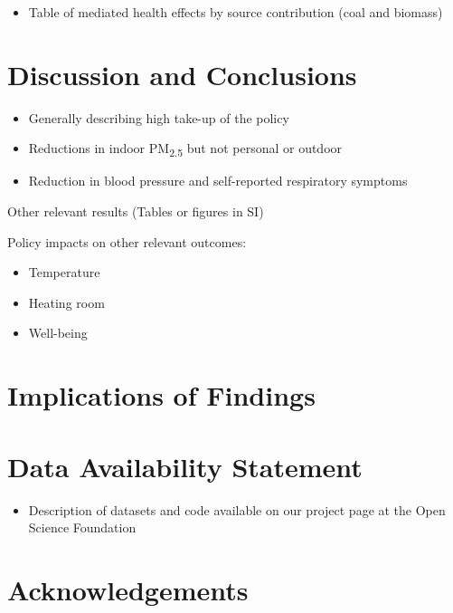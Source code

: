\documentclass[
  letterpaper,
  DIV=11,
  numbers=noendperiod]{scrartcl}
\providecommand{\tightlist}{%
  \setlength{\itemsep}{0pt}\setlength{\parskip}{0pt}}\usepackage{longtable,booktabs,array}
\begin{document}
\begin{itemize}
\tightlist
\item
  Table of mediated health effects by source contribution (coal and
  biomass)
\end{itemize}

\section{Discussion and Conclusions}\label{discussion-and-conclusions}

\begin{itemize}
\tightlist
\item
  Generally describing high take-up of the policy
\item
  Reductions in indoor PM\textsubscript{2.5} but not personal or outdoor
\item
  Reduction in blood pressure and self-reported respiratory symptoms
\end{itemize}

Other relevant results (Tables or figures in SI)

Policy impacts on other relevant outcomes:

\begin{itemize}
\tightlist
\item
  Temperature
\item
  Heating room
\item
  Well-being
\end{itemize}

\section{Implications of Findings}\label{implications-of-findings}

\section{Data Availability Statement}\label{data-availability-statement}

\begin{itemize}
\tightlist
\item
  Description of datasets and code available on our project page at the
  Open Science Foundation
\end{itemize}

\section{Acknowledgements}\label{acknowledgements}
\end{document}

